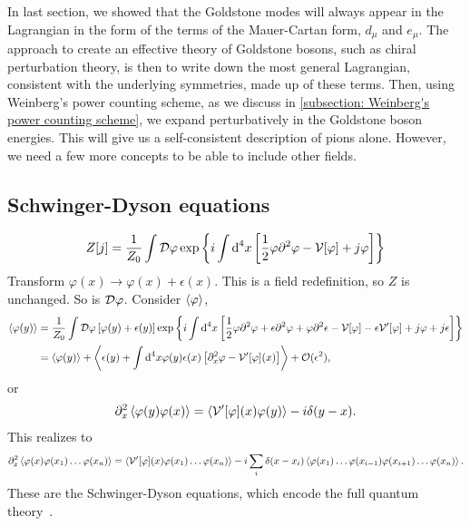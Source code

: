 In last section, we showed that the Goldstone modes will always appear in the Lagrangian in the form of the terms of the Mauer-Cartan form, $d_\mu$ and $e_\mu$.
The approach to create an effective theory of Goldstone bosons, such as chiral perturbation theory, is then to write down the most general Lagrangian, consistent with the underlying symmetries, made up of these terms.
Then, using Weinberg's power counting scheme, as we discuss in \autoref{subsection: Weinberg's power counting scheme}, we expand perturbatively in the Goldstone boson energies.
This will give us a self-consistent description of pions alone.
However, we need a few more concepts to be able to include other fields.



\subsection{Schwinger-Dyson equations}


\begin{align}
    Z[j] = \frac{1}{Z_0} \int \mathcal D \varphi \, 
    \text{exp} \left\{ i \int \text{d}^4 x 
    \left[  
        \frac{1}{2} \varphi \partial^2 \varphi - \mathcal{V}[\varphi] + j\varphi 
    \right] \right\}
\end{align}
%
Transform $\varphi(x) \rightarrow \varphi(x) + \epsilon(x)$.
This is a field redefinition, so $Z$ is unchanged.
So is $\mathcal D \varphi$.
Consider $\braket{\varphi}$,
%
\begin{align}
    \braket{\varphi(y)} &= \frac{1}{Z_0} \int \mathcal D \varphi \, 
    [\varphi(y) + \epsilon(y)]\,
    \text{exp} \left\{ i \int \text{d}^4 x 
    \left[  
        \frac{1}{2} \varphi \partial^2 \varphi 
        + \epsilon \partial^2 \varphi 
        + \varphi \partial^ 2 \epsilon 
        - \mathcal{V}[\varphi] - \epsilon \mathcal{V}'[\varphi] + j\varphi + j \epsilon
    \right] \right\}\\
    & = \braket{\varphi(y)}
    + \Braket{ \epsilon(y) 
    + \int \text{d}^4 x  \varphi(y) \epsilon(x)
    \left[
        \partial_x^2 \varphi
        - \mathcal{V}'[\varphi](x)
    \right] 
    }
    + \mathcal O(\epsilon^2),
\end{align}
%
or
%
\begin{align}
    \partial^2_x \Braket{\varphi(y)\varphi(x)} 
    = 
    \Braket{\mathcal{V}'[\varphi](x) \varphi(y)}
    - i \delta(y - x).
\end{align}
%
This realizes to 
%
\begin{align*}
    \partial^2_x \braket{\varphi(x)\varphi(x_1)\dots \varphi(x_n)}
    = \Braket{\mathcal{V}'[\varphi](x)\varphi(x_1)\dots\varphi(x_n)} 
    -i \sum_i\delta(x - x_i)\braket{\varphi(x_1)\dots \varphi(x_{i-1})\varphi(x_{i+1})\dots \varphi(x_n)}.
\end{align*}
%
These are the  Schwinger-Dyson equations, which encode the full quantum theory~\autocite{schwartzQuantumFieldTheory2013}.


